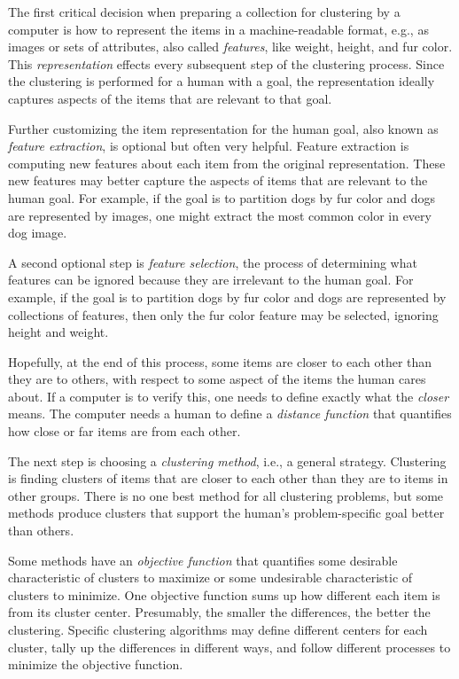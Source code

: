 The first critical decision when preparing a collection for clustering by a computer is how to represent the items in a machine-readable format, e.g., as images or sets of attributes, also called {\it features}, like weight, height, and fur color. This {\it representation} effects every subsequent step of the clustering process. Since the clustering is performed for a human with a goal, the representation ideally captures aspects of the items that are relevant to that goal.

Further customizing the item representation for the human goal, also known as {\it feature extraction}, is optional but often very helpful. Feature extraction is computing new features about each item from the original representation. These new features may better capture the aspects of items that are relevant to the human goal. For example, if the goal is to partition dogs by fur color and dogs are represented by images, one might extract the most common color in every dog image.

A second optional step is {\it feature selection}, the process of determining what features can be ignored because they are irrelevant to the human goal. For example, if the goal is to partition dogs by fur color and dogs are represented by collections of features, then only the fur color feature may be selected, ignoring height and weight.

Hopefully, at the end of this process, some items are closer to each other than they are to others, with respect to some aspect of the items the human cares about. If a computer is to verify this, one needs to define exactly what the {\it closer} means. The computer needs a human to define a {\it distance function} that quantifies how close or far items are from each other.

The next step is choosing a {\it clustering method}, i.e., a general strategy. Clustering is finding clusters of items that are closer to each other than they are to items in other groups. There is no one best method for all clustering problems, but some methods produce clusters that support the human's problem-specific goal better than others.

Some methods have an {\it objective function} that quantifies some desirable characteristic of clusters to maximize or some undesirable characteristic of clusters to minimize. One objective function sums up how different each item is from its cluster center. Presumably, the smaller the differences, the better the clustering. Specific clustering algorithms may define different centers for each cluster, tally up the differences in different ways, and follow different processes to minimize the objective function.

